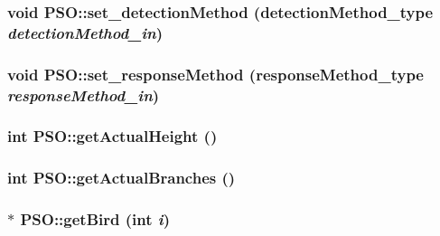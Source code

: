 \hypertarget{classPSO_b86ed161b8395184cce4379614d2b272}{
\subsubsection{\setlength{\rightskip}{0pt plus 5cm}void PSO::set\_\-detectionMethod ({\bf detectionMethod\_\-type} {\em detectionMethod\_\-in})}}
\label{classPSO_b86ed161b8395184cce4379614d2b272}


\hypertarget{classPSO_f627d2f230f5437ded30e32528c2dd72}{
\subsubsection{\setlength{\rightskip}{0pt plus 5cm}void PSO::set\_\-responseMethod ({\bf responseMethod\_\-type} {\em responseMethod\_\-in})}}
\label{classPSO_f627d2f230f5437ded30e32528c2dd72}


\hypertarget{classPSO_07a591196487df7cbad1b991c30b1123}{
\subsubsection{\setlength{\rightskip}{0pt plus 5cm}int PSO::getActualHeight ()}}
\label{classPSO_07a591196487df7cbad1b991c30b1123}


\hypertarget{classPSO_99de54b6a85ef0b84b02edc7c86533e0}{
\subsubsection{\setlength{\rightskip}{0pt plus 5cm}int PSO::getActualBranches ()}}
\label{classPSO_99de54b6a85ef0b84b02edc7c86533e0}


\hypertarget{classPSO_4a7b5aff906eeaa97bd985c690b78492}{
\subsubsection{ $\ast$ PSO::getBird (int {\em i})}}
\label{classPSO_4a7b5aff906eeaa97bd985c690b78492}


